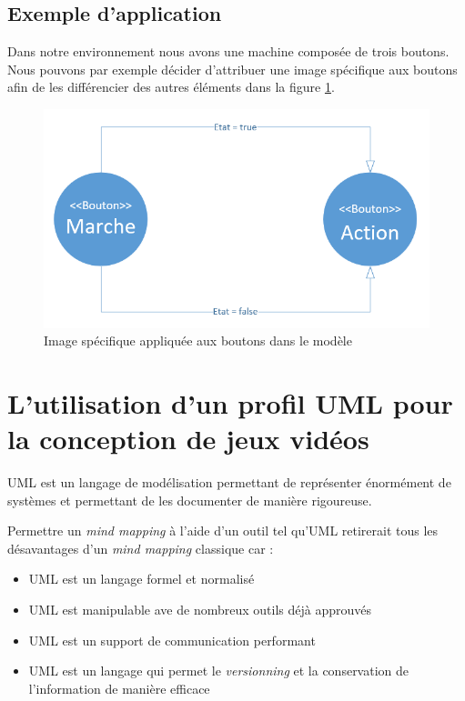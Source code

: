 \subsection{Exemple d'application}
Dans notre environnement nous avons une machine composée de trois boutons.
Nous pouvons par exemple décider d'attribuer une image spécifique aux boutons afin de les différencier des autres éléments dans la figure \ref{fig.uml_img}.



\begin{figure}[H]
    \begin{center}
    \includegraphics[width=12cm]{10_img/chap4/img.PNG}
    \caption{Image spécifique appliquée aux boutons dans le modèle}
    \label{fig.uml_img}
    \end{center}
\end{figure}


\newpage
\section{L'utilisation d'un profil UML pour la conception de jeux vidéos}


UML est un langage de modélisation permettant de représenter énormément de systèmes et permettant de les documenter de manière rigoureuse.

Permettre un \emph{mind mapping} à l'aide d'un outil tel qu'UML retirerait tous les désavantages d'un \emph{mind mapping} classique car :
\begin{itemize}
    \item UML est un langage formel et normalisé
    \item UML est manipulable ave de nombreux outils déjà approuvés
    \item UML est un support de communication performant
    \item UML est un langage qui permet le \emph{versionning} et la conservation de l'information de manière efficace
\end{itemize}


